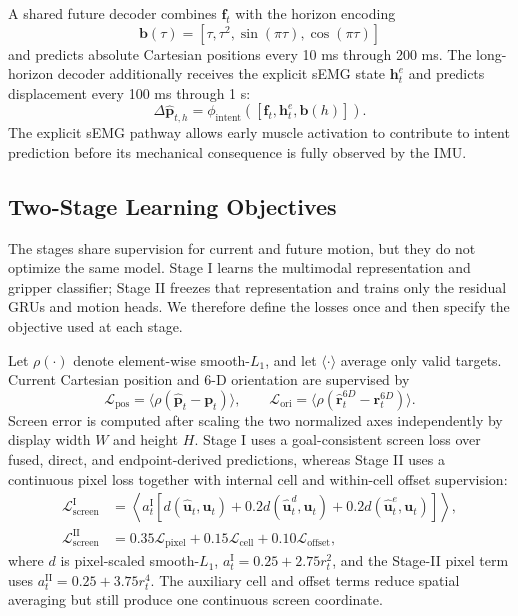 A shared future decoder combines $\mathbf f_t$ with the horizon encoding
\begin{equation}
 \mathbf b(\tau)=[\tau,\tau^2,\sin(\pi\tau),\cos(\pi\tau)]
\end{equation}
and predicts absolute Cartesian positions every 10 ms through 200 ms. The
long-horizon decoder additionally receives the explicit sEMG state
$\mathbf h^e_t$ and predicts displacement every 100 ms through 1 s:
\begin{equation}
 \Delta\hat{\mathbf p}_{t,h}
 =\phi_{\mathrm{intent}}
 ([\mathbf f_t,\mathbf h^e_t,\mathbf b(h)]).
\end{equation}
The explicit sEMG pathway allows early muscle activation to contribute to
intent prediction before its mechanical consequence is fully observed by the
IMU.

\subsection{Two-Stage Learning Objectives}
\label{subsec:two-stage-loss}

The stages share supervision for current and future motion, but they do not
optimize the same model. Stage I learns the multimodal representation and
gripper classifier; Stage II freezes that representation and trains only the
residual GRUs and motion heads. We therefore define the losses once and then
specify the objective used at each stage.

Let $\rho(\cdot)$ denote element-wise smooth-$L_1$, and let
$\langle\cdot\rangle$ average only valid targets. Current Cartesian position
and 6-D orientation are supervised by
\begin{equation}
 \mathcal L_{\mathrm{pos}}=\langle\rho(\hat{\mathbf p}_t-\mathbf p_t)\rangle,
 \qquad
 \mathcal L_{\mathrm{ori}}=\langle\rho(\hat{\mathbf r}^{6D}_t-
 \mathbf r^{6D}_t)\rangle.
\end{equation}
Screen error is computed after scaling the two normalized axes independently
by display width $W$ and height $H$. Stage I uses a goal-consistent screen
loss over fused, direct, and endpoint-derived predictions, whereas Stage II
uses a continuous pixel loss together with internal cell and within-cell
offset supervision:
\begin{align}
 \mathcal L_{\mathrm{screen}}^{\mathrm I}
 &=\left\langle a_t^{\mathrm I}
 [d(\hat{\mathbf u}_t,\mathbf u_t)
 +0.2d(\hat{\mathbf u}^{d}_t,\mathbf u_t)
 +0.2d(\hat{\mathbf u}^{e}_t,\mathbf u_t)]\right\rangle,\\
 \mathcal L_{\mathrm{screen}}^{\mathrm{II}}
 &=0.35\mathcal L_{\mathrm{pixel}}
 +0.15\mathcal L_{\mathrm{cell}}
 +0.10\mathcal L_{\mathrm{offset}},
\end{align}
where $d$ is pixel-scaled smooth-$L_1$,
$a_t^{\mathrm I}=0.25+2.75r_t^2$, and the Stage-II pixel term uses
$a_t^{\mathrm{II}}=0.25+3.75r_t^4$. The auxiliary cell and offset terms reduce
spatial averaging but still produce one continuous screen coordinate.

